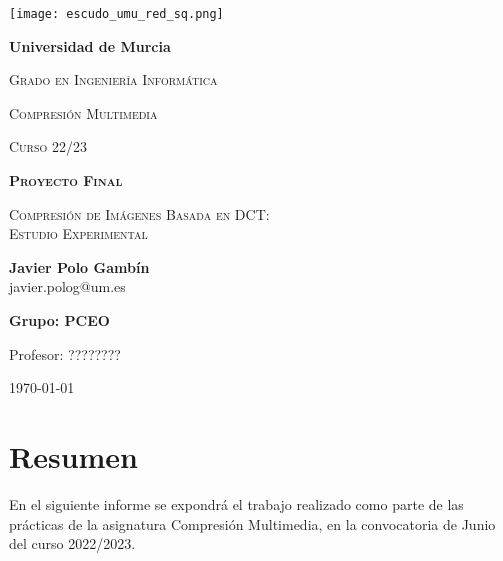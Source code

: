 \documentclass[12pt,a4paper]{article}
\begin{document}
\begin{titlepage}
\centering
{\texttt{[image: escudo\_umu\_red\_sq.png]}\par}
\vspace{1cm}
{\bfseries\LARGE Universidad de Murcia \par}
\vspace{0.5cm}
{\scshape\Large Grado en Ingeniería Informática \par}
\vspace{0.5cm}
{\scshape\Large Compresión Multimedia \par}
{\scshape\Large Curso 22/23 \par}
\vspace{1cm}
{\scshape\Huge \textbf{Proyecto Final\\} \par}
\vspace{0.5cm}
{\scshape \Large Compresión de Imágenes Basada en DCT:\\Estudio Experimental \par}
\vspace{1.5cm}
\vfill


{ \Large\textbf{Javier Polo Gambín} \\
javier.polog@um.es\par}
\vspace{0.7cm}
{\textbf{Grupo: PCEO}\par}
\vspace{0.7cm}
\vfill
{\large Profesor: ???????? \par}
\vfill
{\Large \date{\today} \par}
\vfill
{\large \today \par}
\end{titlepage}

\newpage

\tableofcontents
\newpage 
\listoffigures

\setcounter{tocdepth}{2}

\newpage








\section{Resumen}
En el siguiente informe se expondrá el trabajo realizado como parte de las prácticas de la asignatura Compresión Multimedia, en la convocatoria de Junio del curso 2022/2023.\\
\end{document}
